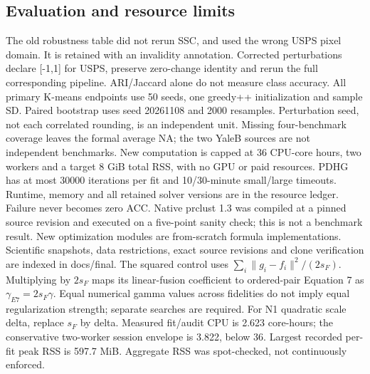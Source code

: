 \subsection{Evaluation and resource limits}
The old robustness table did not rerun SSC, and used the wrong USPS pixel domain. It is retained with an invalidity annotation. Corrected perturbations declare [-1,1] for USPS, preserve zero-change identity and rerun the full corresponding pipeline. ARI/Jaccard alone do not measure class accuracy.
All primary K-means endpoints use 50 seeds, one greedy++ initialization and sample SD. Paired bootstrap uses seed 20261108 and 2000 resamples. Perturbation seed, not each correlated rounding, is an independent unit. Missing four-benchmark coverage leaves the formal average NA; the two YaleB sources are not independent benchmarks.
New computation is capped at 36 CPU-core hours, two workers and a target 8 GiB total RSS, with no GPU or paid resources. PDHG has at most 30000 iterations per fit and 10/30-minute small/large timeouts. Runtime, memory and all retained solver versions are in the resource ledger. Failure never becomes zero ACC.
Native prclust 1.3 was compiled at a pinned source revision and executed on a five-point sanity check; this is not a benchmark result. New optimization modules are from-scratch formula implementations. Scientific snapshots, data restrictions, exact source revisions and clone verification are indexed in docs/final.
The squared control uses $\sum_i\|g_i-f_i\|^2/(2s_F)$. Multiplying by $2s_F$ maps its linear-fusion coefficient to ordered-pair Equation 7 as $\gamma_{E7}=2s_F\gamma$. Equal numerical gamma values across fidelities do not imply equal regularization strength; separate searches are required. For N1 quadratic scale delta, replace $s_F$ by delta.
Measured fit/audit CPU is 2.623 core-hours; the conservative two-worker session envelope is 3.822, below 36. Largest recorded per-fit peak RSS is 597.7 MiB. Aggregate RSS was spot-checked, not continuously enforced.
